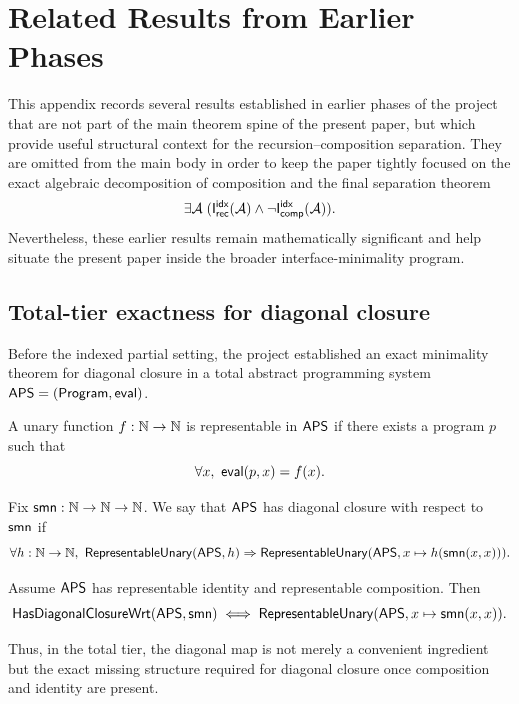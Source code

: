\documentclass[11pt]{article}
\begin{document}
\appendix

\section{Related Results from Earlier Phases}\label{app:related-results}

This appendix records several results established in earlier phases of the project that are not part of the main theorem spine of the present paper, but which provide useful structural context for the recursion--composition separation.  They are omitted from the main body in order to keep the paper tightly focused on the exact algebraic decomposition of composition and the final separation theorem
\[
\exists \mathcal{A}\;(\mathsf{I}_{\mathsf{rec}}^{\mathsf{idx}}(\mathcal{A})\wedge \neg \mathsf{I}_{\mathsf{comp}}^{\mathsf{idx}}(\mathcal{A})).
\]
Nevertheless, these earlier results remain mathematically significant and help situate the present paper inside the broader interface-minimality program.

\subsection{Total-tier exactness for diagonal closure}\label{app:total-tier}

Before the indexed partial setting, the project established an exact minimality theorem for diagonal closure in a total abstract programming system \(\mathsf{APS}=(\mathsf{Program},\mathsf{eval})\).

\begin{definition}
A unary function \(f:\mathbb{N}\to\mathbb{N}\) is representable in \(\mathsf{APS}\) if there exists a program \(p\) such that
\[
\forall x,\ \eval(p,x)=f(x).
\]
\end{definition}

\begin{definition}
Fix \(\mathsf{smn}:\mathbb{N}\to\mathbb{N}\to\mathbb{N}\).  We say that \(\mathsf{APS}\) has diagonal closure with respect to \(\mathsf{smn}\) if
\[
\forall h:\NN\to\NN,\ \RepUnary(\APS,h)\Rightarrow
\RepUnary(\APS, x \mapsto h(\smn(x,x))).
\]
\end{definition}

\begin{theorem}\label{thm:app-total-diag}
Assume \(\mathsf{APS}\) has representable identity and representable composition.  Then
\[
\mathsf{HasDiagonalClosureWrt}(\mathsf{APS},\mathsf{smn})
\;\Longleftrightarrow\;
\mathsf{RepresentableUnary}(\mathsf{APS}, x \mapsto \mathsf{smn}(x,x)).
\]
\end{theorem}

Thus, in the total tier, the diagonal map is not merely a convenient ingredient but the exact missing structure required for diagonal closure once composition and identity are present.
\end{document}
